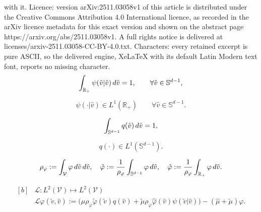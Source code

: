 \documentclass[10pt,a4paper]{amsart}
\newcommand{\R}{\mathbb{R}}
\newcommand{\hmu}{\hat{\mu}}
\newcommand{\hphi}{\hat{\varphi}}
\newcommand{\hv}{\hat{v}}
\newcommand{\intR}{\int_{\R_+}}
\newcommand{\intS}{\int_{\mathbb{S}^{d-1}}}
\newcommand{\intV}{\int_{\mathcal{V}}}
\newcommand{\tmu}{\tilde{\mu}}
\newcommand{\tphi}{\tilde{\varphi}}
\newcommand{\tv}{\tilde{v}}
\begin{document}
with it. Licence: version arXiv:2511.03058v1 of this article is distributed under the Creative Commons Attribution 4.0 International licence, as recorded in the arXiv licence metadata for this exact version and shown on the abstract page https://arxiv.org/abs/2511.03058v1. A full rights notice is delivered at licenses/arxiv-2511.03058-CC-BY-4.0.txt. Characters: every retained excerpt is pure ASCII, so the delivered engine, XeLaTeX with its default Latin Modern text font, reports no missing character.
\begin{equation}\label{norm.psi}
\intR \psi(\tv|\hv) \, {\rm d}\tv =1, \qquad \forall \hv \in \mathbb{S}^{d-1},
\end{equation}

\begin{equation}\label{psi.L1}
    \psi(\cdot|\hv) \in L^1(\R_+) \qquad \forall \hv \in \mathbb{S}^{d-1}.
\end{equation}

\begin{equation}\label{norm.q}
\intS q(\hv) \, {\rm d} \hv =1,
\end{equation}

\begin{equation}\label{q.L1}
    q(\cdot) \in L^1(\mathbb{S}^{d-1}). 
\end{equation}

\begin{equation}\label{def:bthphi}
    \rho_\varphi:= \intV \varphi \, {\rm d} \tv \, {\rm d} \hv, \quad  \tphi:= \dfrac{1}{\rho_\varphi}\intS \varphi \,  {\rm d} \hv, \quad \hphi:=  \dfrac{1}{\rho_\varphi}\intR \varphi \,  {\rm d} \tv.
\end{equation}

\begin{equation}\label{def:L}
\begin{aligned}[b]
&\mathcal{L}: L^2 (\mathcal{V}) \longmapsto L^2 (\mathcal{V})\\[0.3cm]
&\mathcal{L}\varphi(\tv,\hv):=\big(\hmu\rho_\varphi \tphi(\tv) q(\hv)+\tmu\rho_\varphi \hphi(\hv)\psi(\tv|\hv)\big)-(\hmu+\tmu)\varphi. 
  \end{aligned}
\end{equation}
\end{document}
